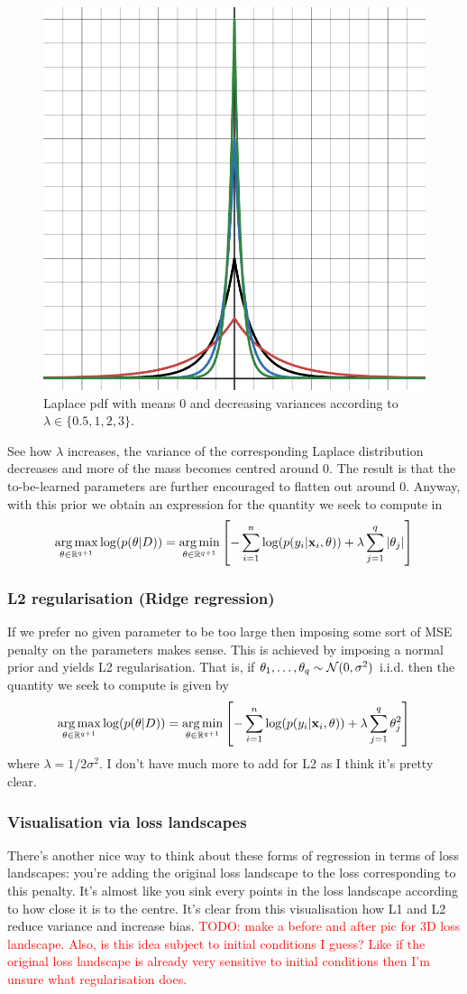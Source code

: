 \documentclass[11pt]{article}
\begin{document}
\begin{figure}[ht]
    \centering
    \includegraphics[width=0.5\columnwidth]{./figures/supervised_learning/laplace_pdf.png}
    \caption{Laplace pdf with means 0 and decreasing variances according to $\lambda\in\{0.5,1,2,3\}$.}
    \label{fig:laplace_pdf}
\end{figure}

See how $\lambda$ increases, the variance of the corresponding Laplace distribution decreases and more of the mass becomes centred around 0. The result is that the to-be-learned parameters are further encouraged to flatten out around 0. Anyway, with this prior we obtain an expression for the quantity we seek to compute in
$$
\operatorname*{arg\,max}_{\theta\in\mathbb{R}^{q+1}}\log(p(\theta|D))
=
\operatorname*{arg\,min}_{\theta\in\mathbb{R}^{q+1}}\left[-\sum_{i=1}^n\log(p(y_i|\mathbf{x}_i,\theta))+\lambda\sum_{j=1}^q|\theta_j|\right]
$$

\subsubsection{L2 regularisation (Ridge regression)}
If we prefer no given parameter to be too large then imposing some sort of MSE penalty on the parameters makes sense. This is achieved by imposing a normal prior and yields L2 regularisation. That is, if $\theta_1,\dots,\theta_q\sim\mathcal{N}(0,\sigma^2)$ i.i.d. then the quantity we seek to compute is given by
$$
\operatorname*{arg\,max}_{\theta\in\mathbb{R}^{q+1}}\log(p(\theta|D))
=
\operatorname*{arg\,min}_{\theta\in\mathbb{R}^{q+1}}\left[-\sum_{i=1}^n\log(p(y_i|\mathbf{x}_i,\theta))+\lambda\sum_{j=1}^q \theta_j^2\right]
$$
where $\lambda=1/2\sigma^2$. I don't have much more to add for L2 as I think it's pretty clear.

\subsubsection{Visualisation via loss landscapes}
There's another nice way to think about these forms of regression in terms of loss landscapes: you're adding the original loss landscape to the loss corresponding to this penalty. It's almost like you sink every points in the loss landscape according to how close it is to the centre. It's clear from this visualisation how L1 and L2 reduce variance and increase bias. \textcolor{red}{TODO: make a before and after pic for 3D loss landscape. Also, is this idea subject to initial conditions I guess? Like if the original loss landscape is already very sensitive to initial conditions then I'm unsure what regularisation does.}
\end{document}
